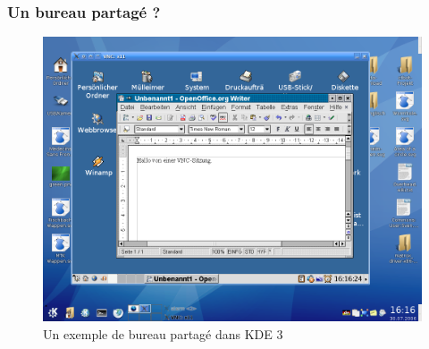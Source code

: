 


\begin{frame}
	\frametitle{Un bureau partagé ? }
	\begin{figure}
		\centering
		\includegraphics[scale=0.22]{resources/VNC.png}
		\caption{Un exemple de bureau partagé dans KDE 3}
	\end{figure}
\end{frame}